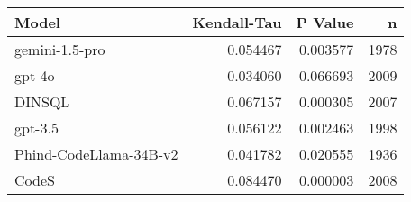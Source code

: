 \begin{tabular}{lrrr}
\toprule
Model & Kendall-Tau & P Value & n \\
\midrule
gemini-1.5-pro & 0.054467 & 0.003577 & 1978 \\
gpt-4o & 0.034060 & 0.066693 & 2009 \\
DINSQL & 0.067157 & 0.000305 & 2007 \\
gpt-3.5 & 0.056122 & 0.002463 & 1998 \\
Phind-CodeLlama-34B-v2 & 0.041782 & 0.020555 & 1936 \\
CodeS & 0.084470 & 0.000003 & 2008 \\
\bottomrule
\end{tabular}
